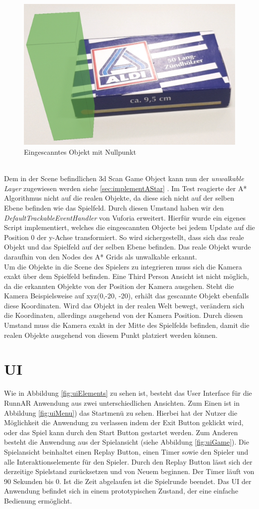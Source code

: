 \begin{figure}[h]
    \centering
    \includegraphics[width=0.5\linewidth]{assets/matches.png}
    \caption{Eingescanntes Objekt mit Nullpunkt}\label{fig:matches}
\end{figure}\\
Dem in der Scene befindlichen 3d Scan Game Object kann nun der \textit{unwalkable Layer} zugewiesen werden siehe \ref{sec:implementAStar} . Im Test reagierte der A* Algorithmus nicht auf die realen Objekte, da diese sich nicht auf der selben Ebene befinden wie das Spielfeld. Durch diesen Umstand haben wir den \textit{DefaultTrackableEventHandler} von Vuforia erweitert. Hierfür wurde ein eigenes Script implementiert, welches die eingescannten Objecte bei jedem Update auf die Position 0 der y-Achse transformiert. So wird sichergestellt, dass sich das reale Objekt und das Spielfeld auf der selben Ebene befinden. Das reale Objekt wurde daraufhin von den Nodes des A* Grids als unwalkable erkannt. \\
Um die Objekte in die Scene des Spielers zu integrieren muss sich die Kamera exakt über dem Spielfeld befinden. Eine Third Person Ansicht ist nicht möglich, da die erkannten Objekte von der Position der Kamera ausgehen. Steht die Kamera Beispielsweise auf xyz(0,-20, -20), erhält das gescannte Objekt ebenfalls diese Koordinaten. Wird das Objekt in der realen Welt bewegt, verändern sich die Koordinaten, allerdings ausgehend von der Kamera Position. Durch diesen Umstand muss die Kamera exakt in der Mitte des Spielfelds befinden, damit die realen Objekte ausgehend von diesem Punkt platziert werden können.

\section{UI}
Wie in Abbildung \ref{fig:uiElements} zu sehen ist, besteht das User Interface für die RunnAR Anwendung aus zwei unterschiedlichen Ansichten. Zum Einen ist in Abbildung \ref{fig:uiMenu}) das Startmenü zu sehen. Hierbei hat der Nutzer die Möglichkeit die Anwendung zu verlassen indem der Exit Button geklickt wird, oder das Spiel kann durch den Start Button gestartet werden. Zum Anderen besteht die Anwendung aus der Spielansicht (siehe Abbildung \ref{fig:uiGame}). Die Spielansicht beinhaltet einen Replay Button, einen Timer sowie den Spieler und alle Interaktionselemente für den Spieler. Durch den Replay Button lässt sich der derzeitige Spielstand zurücksetzen und von Neuem beginnen. Der Timer läuft von 90 Sekunden bis 0. Ist die Zeit abgelaufen ist die Spielrunde beendet. Das UI der Anwendung befindet sich in einem prototypischen Zustand, der eine einfache Bedienung ermöglicht.

